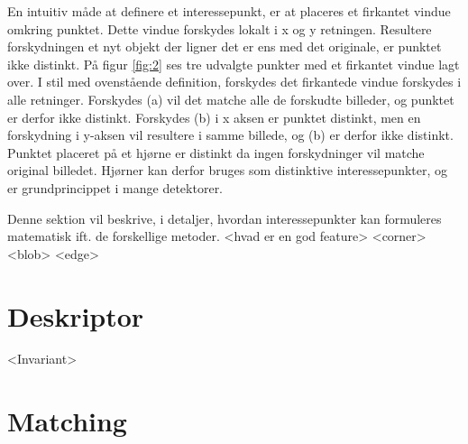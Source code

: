 En intuitiv måde at definere et interessepunkt, er at  placeres et firkantet vindue omkring punktet. Dette vindue forskydes lokalt i x og y retningen. Resultere forskydningen et nyt objekt der ligner det er ens med det originale, er punktet ikke distinkt. På figur \ref{fig:2} ses tre udvalgte punkter med et firkantet vindue lagt over. I stil med ovenstående definition, forskydes det firkantede vindue forskydes i alle retninger. Forskydes (a) vil det matche alle de forskudte billeder, og punktet er derfor ikke distinkt. Forskydes (b) i x aksen er punktet distinkt, men en forskydning i y-aksen vil resultere i samme billede, og (b) er derfor ikke distinkt. Punktet placeret på et hjørne er distinkt da ingen forskydninger vil matche original billedet. Hjørner kan derfor bruges som distinktive interessepunkter, og er grundprincippet i mange detektorer.



Denne sektion vil beskrive, i detaljer, hvordan interessepunkter kan formuleres matematisk ift. de forskellige metoder.
<hvad er en god feature>
<corner>
<blob>
<edge>
\section{Deskriptor}
<Invariant>
\section{Matching}
